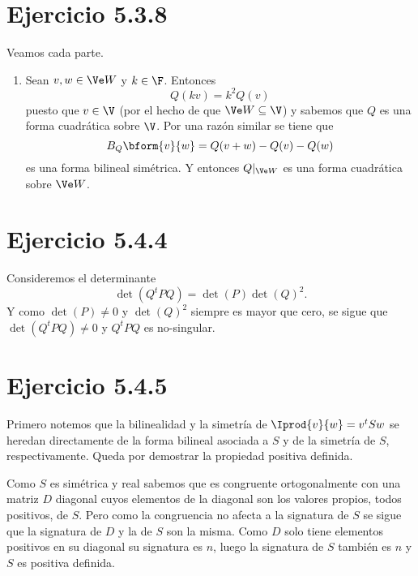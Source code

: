 \section*{Ejercicio 5.3.8}
\begin{sol} Veamos cada parte.
	\begin{enumerate}
		\item Sean $v,w\in\Ve W$ y $k\in\F$. Entonces
		\[ Q(kv) = k^2Q(v) \] 
		puesto que $v\in\V$ (por el hecho de que $\Ve W\subseteq\V$) y sabemos que $Q$ es una forma cuadrática sobre $\V$. Por una razón similar se tiene que
		\[ B_Q\bform{v}{w} = Q(v+w) - Q(v) - Q(w) \]
		es una forma bilineal simétrica.
		Y entonces $Q|_{\Ve W}$ es una forma cuadrática sobre $\Ve W$. 
	\end{enumerate}
\end{sol}
\section*{Ejercicio 5.4.4}
\begin{sol}
	Consideremos el determinante
	\[ \det(Q^tPQ) =  \det(P)\det(Q)^2. \]
	Y como $\det(P)\neq 0$ y $\det(Q)^2$ siempre es mayor que cero, se sigue que $\det(Q^tPQ)\neq 0$ y $Q^tPQ$ es no-singular.
\end{sol}
\section*{Ejercicio 5.4.5}
\begin{sol}
	Primero notemos que la bilinealidad y la simetría de $\Iprod{v}{w} = v^tSw$ se heredan directamente de la forma bilineal asociada a $S$ y de la simetría de $S$, respectivamente. Queda por demostrar la propiedad positiva definida.
	
	Como $S$ es simétrica y real sabemos que es congruente ortogonalmente con una matriz $D$ diagonal cuyos elementos de la diagonal son los valores propios, todos positivos, de $S$. Pero como la congruencia no afecta a la signatura de $S$ se sigue que la signatura de $D$ y la de $S$ son la misma. Como $D$ solo tiene elementos positivos en su diagonal su signatura es $n$, luego la signatura de $S$ también es $n$ y $S$ es positiva definida.
\end{sol}
